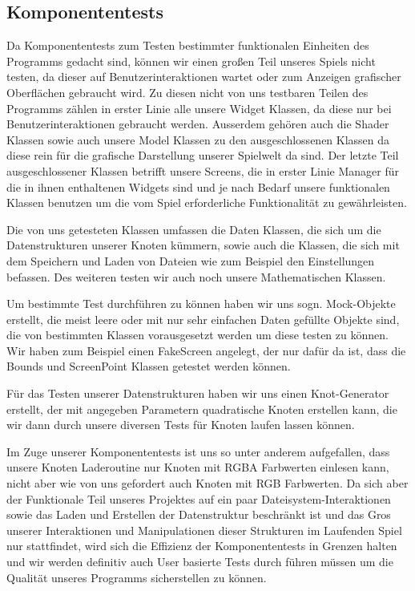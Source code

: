 %



\newpage



\label{Abschnitt:Tests:Protokoll:Komponenten}



\subsection*{Komponententests}


Da Komponententests zum Testen bestimmter funktionalen Einheiten des Programms gedacht sind, können wir einen großen Teil unseres Spiels nicht testen, da dieser auf Benutzerinteraktionen wartet oder zum Anzeigen grafischer Oberflächen gebraucht wird. 
Zu diesen nicht von uns testbaren Teilen des Programms zählen in erster Linie alle unsere Widget Klassen, da diese nur bei Benutzerinteraktionen gebraucht werden. Ausserdem gehören auch die Shader Klassen sowie auch unsere Model Klassen zu den ausgeschlossenen Klassen da diese rein für die grafische Darstellung unserer Spielwelt da sind. Der letzte Teil ausgeschlossener Klassen betrifft unsere Screens, die in erster Linie Manager für die in ihnen enthaltenen Widgets sind und je nach Bedarf unsere funktionalen Klassen benutzen um die vom Spiel erforderliche Funktionalität zu gewährleisten.

Die von uns getesteten Klassen umfassen die Daten Klassen, die sich um die Datenstrukturen unserer Knoten kümmern, sowie auch die Klassen, die sich mit dem Speichern und Laden von Dateien wie zum Beispiel den Einstellungen befassen.
Des weiteren testen wir auch noch unsere Mathematischen Klassen.

Um bestimmte Test durchführen zu können haben wir uns sogn. Mock-Objekte erstellt, die meist leere oder mit nur sehr einfachen Daten gefüllte Objekte sind, die von bestimmten Klassen vorausgesetzt werden um diese testen zu können. Wir haben zum Beispiel einen FakeScreen angelegt, der nur dafür da ist, dass die Bounds und ScreenPoint Klassen getestet werden können.

Für das Testen unserer Datenstrukturen haben wir uns einen Knot-Generator erstellt, der mit angegeben Parametern quadratische Knoten erstellen kann, die wir dann durch unsere diversen Tests für Knoten laufen lassen können.

Im Zuge unserer Komponententests ist uns so unter anderem aufgefallen, dass unsere Knoten Laderoutine nur Knoten mit RGBA Farbwerten einlesen kann, nicht aber wie von uns gefordert auch Knoten mit RGB Farbwerten. Da sich aber der Funktionale Teil unseres Projektes auf ein paar Dateisystem-Interaktionen sowie das Laden und Erstellen der Datenstruktur beschränkt ist und das Gros unserer Interaktionen und Manipulationen dieser Strukturen im Laufenden Spiel nur stattfindet, wird sich die Effizienz der Komponententests in Grenzen halten und wir werden definitiv auch User basierte Tests durch führen müssen um die Qualität unseres Programms sicherstellen zu können.


